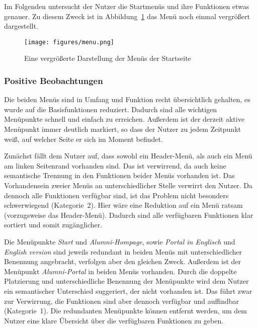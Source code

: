 %

Im Folgenden untersucht der Nutzer die Startmenüs und ihre Funktionen etwas genauer. Zu diesem Zweck ist in Abbildung~\ref{fig:menu} das Menü noch einmal vergrößert dargestellt.

\begin{figure}[h]
	\centering
		\texttt{[image: figures/menu.png]}
	\caption{Eine vergrößerte Darstellung der Menüs der Startseite}
	\label{fig:menu}
\end{figure}


\subsubsection*{Positive Beobachtungen}
Die beiden Menüs sind in Umfang und Funktion recht übersichtlich gehalten, es wurde auf die Basisfunktionen reduziert. Dadurch sind alle wichtigen Menüpunkte schnell und einfach zu erreichen. 
Außerdem ist der derzeit aktive Menüpunkt immer deutlich markiert, so dass der Nutzer zu jedem Zeitpunkt weiß, auf welcher Seite er sich im Moment befindet.

{Zunächst fällt dem Nutzer auf, dass sowohl ein Header-Menü, als auch ein Menü am linken Seitenrand vorhanden sind. Das ist verwirrend, da auch keine semantische Trennung in den Funktionen beider Menüs vorhanden ist. 
}{Das Vorhandensein zweier Menüs an unterschiedlicher Stelle verwirrt den Nutzer. Da dennoch alle Funktionen verfügbar sind, ist das Problem nicht besonders schwerwiegend (Kategorie~2).
}{Hier wäre eine Reduktion auf ein Menü ratsam (vorzugsweise das Header-Menü). Dadurch sind alle verfügbaren Funktionen klar sortiert und somit zugänglicher. 
}\label{prob:start:menues}

{Die Menüpunkte \emph{Start} und \emph{Alumni-Hompage}, sowie \emph{Portal in Englisch} und \emph{English version} sind jeweils redundant in beiden Menüs mit unterschiedlicher Benennung angebracht, verfolgen aber den gleichen Zweck. Außerdem ist der Menüpunkt \emph{Alumni-Portal} in beiden Menüs vorhanden.
}
{Durch die doppelte Platzierung und unterschiedliche Benennung der Menüpunkte wird dem Nutzer ein semantischer Unterschied suggeriert, der nicht vorhanden ist. Das führt zwar zur Verwirrung, die Funktionen sind aber dennoch verfügbar und auffindbar (Kategorie~1).
}
{Die redundanten Menüpunkte können entfernt werden, um dem Nutzer eine klare Übersicht über die verfügbaren Funktionen zu geben. 
}\label{prob:start:funktionen}

